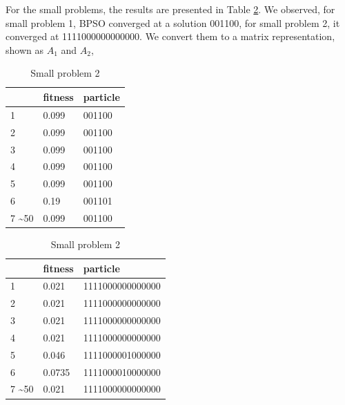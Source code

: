 For the small problems, the results are presented in Table \ref{tab:small}. We observed, for small problem 1, BPSO converged at a solution 001100, 
for small problem 2, it converged at 1111000000000000.
We convert them to a matrix representation, shown  as $A_1$ and $A_2$,

\begin{table}[!h]
\footnotesize
\centering
\caption{Small problems}
\begin{subtable}{.4\linewidth}
\centering
\caption{Small problem 1}
\begin{tabular}{|l|l|l|}
\hline
     & fitness & particle \\ \hline
1    & 0.099   & 001100   \\ \hline
2    & 0.099   & 001100   \\ \hline
3    & 0.099   & 001100   \\ \hline
4    & 0.099   & 001100   \\ \hline
5    & 0.099   & 001100   \\ \hline
6    & 0.19    & 001101   \\ \hline
7 \sim 50 & 0.099   & 001100   \\ \hline

\end{tabular}

\end{subtable}
\begin{subtable}{.4\linewidth}
\centering
\caption{Small problem 2}

\begin{tabular}{|l|l|l|}
\hline
     & fitness & particle \\ \hline
1    & 0.021   & 1111000000000000   \\ \hline
2    & 0.021   & 1111000000000000   \\ \hline
3    & 0.021   & 1111000000000000   \\ \hline
4    & 0.021   & 1111000000000000   \\ \hline
5    & 0.046   & 1111000001000000   \\ \hline
6    & 0.0735  & 1111000010000000   \\ \hline
7 \sim 50    & 0.021   & 1111000000000000   \\ \hline
\end{tabular}
\end{subtable}
\label{tab:small}
\end{table}


